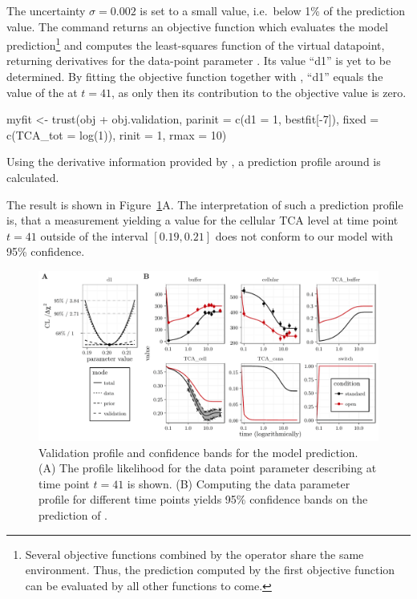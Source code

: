 \documentclass[article]{jss}
\begin{document}
The uncertainty $\sigma = 0.002$ is set to a small
value, i.e.~below 1\% of the prediction value. The 
command returns an objective function which evaluates the model prediction\footnote{Several objective functions combined by the  operator
share the same environment. Thus, the prediction computed by the first
objective function can be evaluated by all other functions to come.} and
computes the least-squares function of the virtual datapoint, returning
derivatives for the data-point parameter . Its value ``d1'' is yet to be
determined. By fitting the objective function  together with
, ``d1'' equals the value of the  at
$t=41$, as only then its contribution to the objective value is zero.
\begin{CodeChunk}
\begin{CodeInput}
myfit <- trust(obj + obj.validation,
	       parinit = c(d1 = 1, bestfit[-7]),
	       fixed = c(TCA_tot = log(1)),
	       rinit = 1, rmax = 10)
\end{CodeInput}
\end{CodeChunk}
Using the derivative information provided by , a
prediction profile around  is calculated.
\begin{CodeChunk}
\end{CodeChunk}

The result is shown in Figure~\ref{fig:validation}A. The interpretation of
such a prediction profile is, that a measurement yielding a value for the
cellular TCA level at time point $t=41$ outside of the interval $[0.19,0.21]$
does not conform to our model with 95\% confidence.

\begin{figure}[ht]
	\centering
	\includegraphics[width = \textwidth]{images/figure9}
	\caption{Validation profile and confidence bands for the model prediction.
(A) The profile likelihood for the data point parameter  describing
 at time point $t = 41$ is shown. (B) Computing the data
parameter profile for different time points yields 95\% confidence bands on the
prediction of .}
	\label{fig:validation}
\end{figure}
\end{document}
